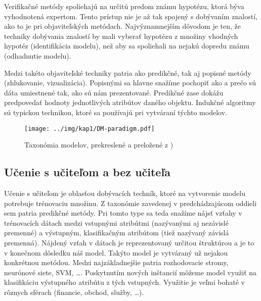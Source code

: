 Verifikačné metódy spoliehajú na určitú predom známu hypotézu, ktorá býva vyhodnotená expertom. Tento prístup nie je až tak spojený s dobývaním znalostí, ako to je pri objaviteľských metódach. Najvýznamnejším dôvodom je ten, že techniky dobývania znalostí by mali vyberať hypotézu z množiny vhodných hypotéz (identifikácia modelu), než aby sa spoliehali na nejakú dopredu známu (odhadnutie modelu).

Medzi takéto objaviteľské techniky patria ako predikčné, tak aj popisné metódy (zhlukovanie, vizualizácia). Popisnými sa hlavne snažíme pochopiť ako a prečo sú dáta umiestnené tak, ako sú nám prezentované. Predikčné zase dokážu predpovedať hodnoty jednotlivých atribútov daného objektu. Indukčné algoritmy sú typickou technikou, ktoré sa používajú pri vytváraní týchto modelov.

\begin{figure}[h]
\centering
\centerline{\mbox{\texttt{[image: ../img/kap1/DM-paradigm.pdf]}}}
\caption{Taxonómia modelov, prekreslené a preložené z \cite{kap1-DataMiningForTrees})}\label{fig:dataMineParad}
\end{figure}

\subsection{Učenie s učiteľom a bez učiteľa}\label{kap1:2.2:2.2.4:Supervised}
Učenie s učiteľom je oblasťou dobývacích techník, ktoré na vytvorenie modelu potrebuje trénovaciu množinu. Z taxonómie zavedenej v predchádzajúcom oddieli sem patria predikčné metódy. Pri tomto type sa teda snažíme nájsť vzťahy v trénovacích dátach medzi vstupnými atribútmi (nazývanými aj nezávislé premenné) a výstupným, klasifikačným atribútom (tiež nazývaný závislá premenná). Nájdený vzťah v dátach je reprezentovaný určitou štruktúrou a je to v konečnom dôsledku náš model. Takýto model je vytváraný už nejakou konkrétnou metódou. Medzi najzákladnejšie patria rozhodovacie stromy, neurónové siete, SVM, \ldots. Poskytnutím nových inštancií môžeme model využiť na klasifikáciu výstupného atribútu z tých vstupných.
Využitie je veľmi bohaté v rôznych sférach (financie, obchod, služby, \ldots). 

